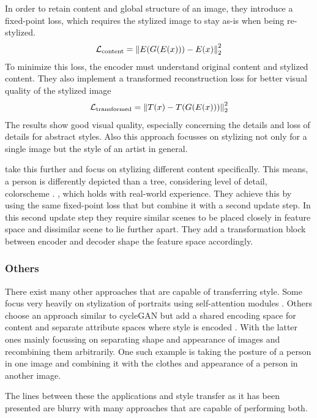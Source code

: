In order to retain content and global structure of an image, they introduce a fixed-point loss, which requires the stylized image to stay as-is when being re-stylized.
\begin{align}
    \mathcal{L}_{\text{content}} = \left\lVert E(G(E(x))) - E(x)\right\rVert^2_2
\end{align}
To minimize this loss, the encoder must understand original content and stylized content.
They also implement a transformed reconstruction loss for better visual quality of the stylized image
\begin{align}
    \mathcal{L}_{\text{transformed}} = \left\lVert T(x) - T(G(E(x)))\right\rVert^2_2
\end{align}
The results show good visual quality, especially concerning the details and loss of details for abstract styles.
Also this approach focusses on stylizing not only for a single image but the style of an artist in general.

\citeauthor*{dima} take this further and focus on stylizing different content specifically.
This means, a person is differently depicted than a tree, considering level of detail, colorscheme \etc. , which holds with real-world experience.
They achieve this by using the same fixed-point loss that \citeauthor*{artsiom} but combine it with a second update step.
In this second update step they require similar scenes to be placed closely in feature space and dissimilar scene to lie further apart.
They add a transformation block between encoder and decoder shape the feature space accordingly.

\subsubsection{Others}
There exist many other approaches that are capable of transferring style.
Some focus very heavily on stylization of portraits using self-attention modules \cite{ugatit}.
Others choose an approach similar to cycleGAN but add a shared encoding space for content and separate attribute spaces where style is encoded \cite{unit, munit, drit, drit++}.
With the latter ones mainly focussing on separating shape and appearance of images and recombining them arbitrarily.
One such example is taking the posture of a person in one image and combining it with the clothes and appearance of a person in another image.

The lines between these the applications and style transfer as it has been presented are blurry with many approaches that are capable of performing both.


